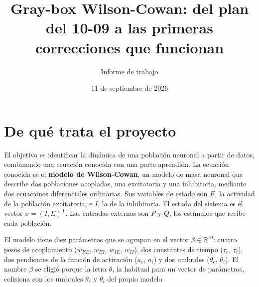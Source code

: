 \documentclass[11pt,a4paper]{article}
\title{\vspace{-1.5cm}\textbf{Gray-box Wilson-Cowan: del plan del 10-09 a las
primeras correcciones que funcionan}}
\author{Informe de trabajo}
\date{11 de septiembre de 2026}
\newcommand{\term}[1]{\textbf{#1}}
\begin{document}
\maketitle
\vspace{-0.6cm}

\noindent{}

\section{De qué trata el proyecto}

El objetivo es identificar la dinámica de una población neuronal a partir de
datos, combinando una ecuación conocida con una parte aprendida. La ecuación
conocida es el \term{modelo de Wilson-Cowan}, un modelo de masa neuronal que
describe dos poblaciones acopladas, una excitatoria y una inhibitoria, mediante
dos ecuaciones diferenciales ordinarias. Sus variables de estado son $E$, la
actividad de la población excitatoria, e $I$, la de la inhibitoria. El estado
del sistema es el vector $x = (I, E)^{\mathsf{T}}$. Las entradas externas son
$P$ y $Q$, los estímulos que recibe cada población.

El modelo tiene diez parámetros que se agrupan en el vector
$\beta \in \mathbb{R}^{10}$: cuatro pesos de acoplamiento
($w_{EE}$, $w_{EI}$, $w_{IE}$, $w_{II}$), dos constantes de tiempo
($\tau_e$, $\tau_i$), dos pendientes de la función de activación
($a_e$, $a_i$) y dos umbrales ($\theta_e$, $\theta_i$). El nombre $\beta$ se
eligió porque la letra $\theta$, la habitual para un vector de parámetros,
colisiona con los umbrales $\theta_e$ y $\theta_i$ del propio modelo.
\end{document}
